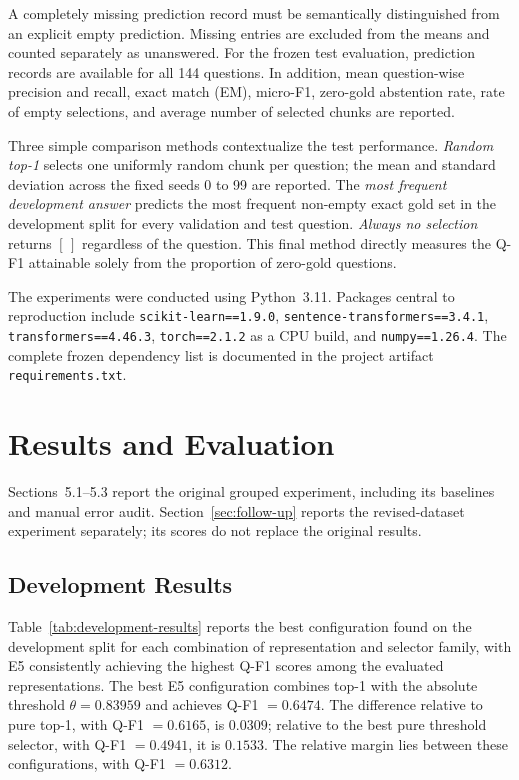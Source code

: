 \documentclass[11pt]{article}
\newcommand{\revision}[1]{{\color{blue}#1}}
\begin{document}
A completely missing prediction record must be semantically distinguished from an explicit empty prediction. Missing entries are excluded from the means and counted separately as unanswered. For the frozen test evaluation, prediction records are available for all 144 questions. In addition, mean question-wise precision and recall, exact match (EM), micro-F1, zero-gold abstention rate, rate of empty selections, and average number of selected chunks are reported.

Three simple comparison methods contextualize the test performance. \emph{Random top-1} selects one uniformly random chunk per question; the mean and standard deviation across the fixed seeds 0 to 99 are reported. The \emph{most frequent development answer} predicts the most frequent non-empty exact gold set in the development split for every validation and test question. \emph{Always no selection} returns $[\,]$ regardless of the question. This final method directly measures the Q-F1 attainable solely from the proportion of zero-gold questions.

The experiments were conducted using Python~3.11. Packages central to reproduction include \texttt{scikit-learn==1.9.0}, \texttt{sentence-transformers==3.4.1}, \texttt{transformers==4.46.3}, \texttt{torch==2.1.2} as a CPU build, and \texttt{numpy==1.26.4}. The complete frozen dependency list is documented in the project artifact \texttt{requirements.txt}.


\section{Results and Evaluation}

\revision{Sections~5.1--5.3 report the original grouped experiment, including its baselines and manual error audit. Section~\ref{sec:follow-up} reports the revised-dataset experiment separately; its scores do not replace the original results.}

\subsection{Development Results}

Table~\ref{tab:development-results} reports the best configuration found on the development split for each combination of representation and selector family, with E5 consistently achieving the highest Q-F1 scores among the evaluated representations. The best E5 configuration combines top-1 with the absolute threshold $\theta=0.83959$ and achieves Q-F1 $=0.6474$. The difference relative to pure top-1, with Q-F1 $=0.6165$, is $0.0309$; relative to the best pure threshold selector, with Q-F1 $=0.4941$, it is $0.1533$. The relative margin lies between these configurations, with Q-F1 $=0.6312$.
\end{document}
